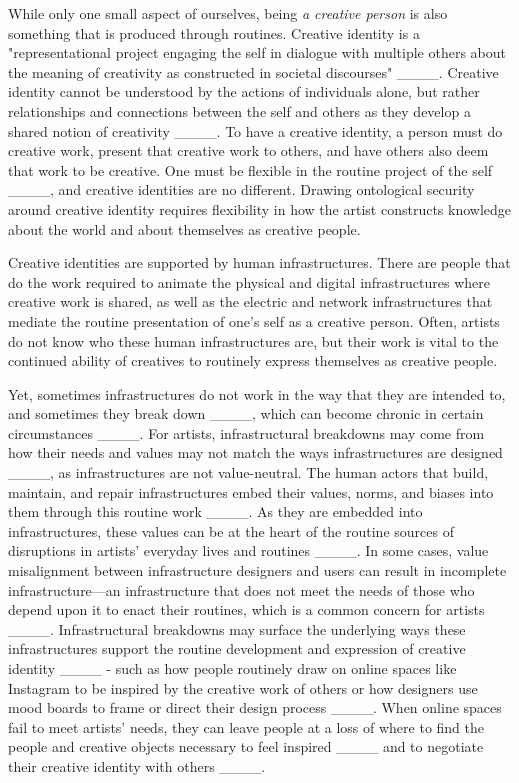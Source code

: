     While only one small aspect of ourselves, being \textit{a creative person} is also something that is produced through routines. Creative identity is a "representational project engaging the self in dialogue with multiple others about the meaning of creativity as constructed in societal discourses" ____. Creative identity cannot be understood by the actions of individuals alone, but rather relationships and connections between the self and others as they develop a shared notion of creativity ____. To have a creative identity, a person must do creative work, present that creative work to others, and have others also deem that work to be creative. One must be flexible in the routine project of the self ____, and creative identities are no different. Drawing ontological security around creative identity requires flexibility in how the artist constructs knowledge about the world and about themselves as creative people. \par
   
    Creative identities are supported by human infrastructures. There are people that do the work required to animate the physical and digital infrastructures where creative work is shared, as well as the electric and network infrastructures that mediate the routine presentation of one's self as a creative person. Often, artists do not know who these human infrastructures are, but their work is vital to the continued ability of creatives to routinely express themselves as creative people. \par

    Yet, sometimes infrastructures do not work in the way that they are intended to, and sometimes they break down ____, which can become chronic in certain circumstances ____. For artists, infrastructural breakdowns may come from how their needs and values may not match the ways infrastructures are designed ____, as infrastructures are not value-neutral. The human actors that build, maintain, and repair infrastructures embed their values, norms, and biases into them through this routine work ____. As they are embedded into infrastructures, these values can be at the heart of the routine sources of disruptions in artists' everyday lives and routines ____. In some cases, value misalignment between infrastructure designers and users can result in incomplete infrastructure---an infrastructure that does not meet the needs of those who depend upon it to enact their routines, which is a common concern for artists ____. Infrastructural breakdowns may surface the underlying ways these infrastructures support the routine development and expression of creative identity ____ - such as how people routinely draw on online spaces like Instagram to be inspired by the creative work of others or how designers use mood boards to frame or direct their design process ____. When online spaces fail to meet artists’ needs, they can leave people at a loss of where to find the people and creative objects necessary to feel inspired ____ and to negotiate their creative identity with others ____.  \par 
    

